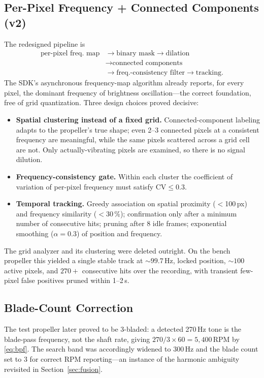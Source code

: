 \documentclass[conference]{IEEEtran}
\begin{document}
\subsection{Per-Pixel Frequency + Connected Components (v2)}
The redesigned pipeline is
\begin{equation*}
\begin{split}
\text{per-pixel freq.\ map} &\rightarrow \text{binary mask}
\rightarrow \text{dilation} \\
&\rightarrow \text{connected components} \\
&\rightarrow \text{freq.-consistency filter}
\rightarrow \text{tracking}.
\end{split}
\end{equation*}
The SDK's asynchronous frequency-map algorithm already reports, for every
pixel, the dominant frequency of brightness oscillation---the correct
foundation, free of grid quantization. Three design choices proved
decisive:
\begin{itemize}
\item \textbf{Spatial clustering instead of a fixed grid.}
      Connected-component labeling adapts to the propeller's true shape;
      even 2--3 connected pixels at a consistent frequency are
      meaningful, while the same pixels scattered across a grid cell are
      not. Only actually-vibrating pixels are examined, so there is no
      signal dilution.
\item \textbf{Frequency-consistency gate.} Within each cluster the
      coefficient of variation of per-pixel frequency must satisfy
      $\mathrm{CV} \le 0.3$.
\item \textbf{Temporal tracking.} Greedy association on spatial
      proximity ($<$100\,px) and frequency similarity ($<$30\,\%);
      confirmation only after a minimum number of consecutive hits;
      pruning after 8 idle frames; exponential smoothing
      ($\alpha = 0.3$) of position and frequency.
\end{itemize}
The grid analyzer and its clustering were deleted outright. On the bench
propeller this yielded a single stable track at ${\sim}99.7$\,Hz, locked
position, ${\sim}100$ active pixels, and $270{+}$ consecutive hits over
the recording, with transient few-pixel false positives pruned within
1--2\,s.

\subsection{Blade-Count Correction}
The test propeller later proved to be 3-bladed: a detected 270\,Hz tone
is the blade-pass frequency, not the shaft rate, giving
$270/3 \times 60 = 5{,}400$\,RPM by \eqref{eq:bpf}. The search band was
accordingly widened to 300\,Hz and the blade count set to 3 for correct
RPM reporting---an instance of the harmonic ambiguity revisited in
Section~\ref{sec:fusion}.
\end{document}
